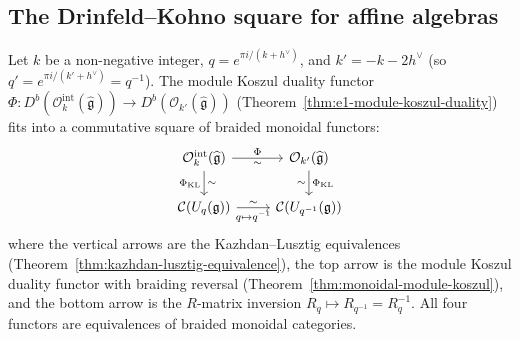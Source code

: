 \subsection{The Drinfeld--Kohno square for affine algebras}

\begin{theorem}\label{thm:derived-dk-affine}
Let $k$ be a non-negative integer,
$q = e^{\pi i/(k + h^\vee)}$, and $k' = -k - 2h^\vee$
\textup{(}so $q' = e^{\pi i/(k' + h^\vee)} = q^{-1}$\textup{)}.
The module Koszul duality functor
$\Phi \colon D^b(\mathcal{O}_k^{\mathrm{int}}(\widehat{\mathfrak{g}}))
\to D^b(\mathcal{O}_{k'}(\widehat{\mathfrak{g}}))$
\textup{(}Theorem~\textup{\ref{thm:e1-module-koszul-duality})}
fits into a commutative square of braided monoidal functors:
\begin{equation}\label{eq:dk-square-affine}
\begin{tikzcd}
\mathcal{O}_k^{\mathrm{int}}(\widehat{\mathfrak{g}})
  \ar[r, "\Phi", "\sim"']
  \ar[d, "\Phi_{\mathrm{KL}}"', "\sim"]
& \mathcal{O}_{k'}(\widehat{\mathfrak{g}})
  \ar[d, "\Phi_{\mathrm{KL}}", "\sim"']
\\
\mathcal{C}(U_q(\mathfrak{g}))
  \ar[r, "q \mapsto q^{-1}"', "\sim"]
& \mathcal{C}(U_{q^{-1}}(\mathfrak{g}))
\end{tikzcd}
\end{equation}
where the vertical arrows are the Kazhdan--Lusztig equivalences
\textup{(}Theorem~\textup{\ref{thm:kazhdan-lusztig-equivalence})},
the top arrow is the module Koszul duality functor with braiding
reversal
\textup{(}Theorem~\textup{\ref{thm:monoidal-module-koszul})}, and
the bottom arrow is the $R$-matrix inversion
$R_q \mapsto R_{q^{-1}} = R_q^{-1}$.  All four functors are
equivalences of braided monoidal categories.
\end{theorem}

